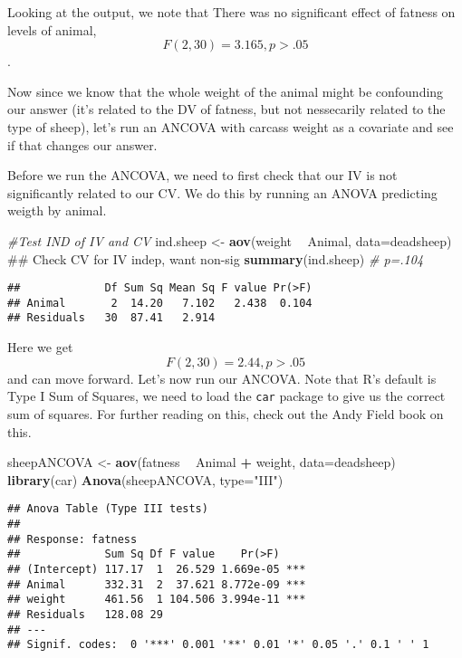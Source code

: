 \documentclass[]{book}
\newenvironment{Shaded}{\begin{snugshade}}{\end{snugshade}}
\newcommand{\KeywordTok}[1]{\textcolor[rgb]{0.13,0.29,0.53}{\textbf{#1}}}
\newcommand{\DataTypeTok}[1]{\textcolor[rgb]{0.13,0.29,0.53}{#1}}
\newcommand{\StringTok}[1]{\textcolor[rgb]{0.31,0.60,0.02}{#1}}
\newcommand{\CommentTok}[1]{\textcolor[rgb]{0.56,0.35,0.01}{\textit{#1}}}
\newcommand{\OperatorTok}[1]{\textcolor[rgb]{0.81,0.36,0.00}{\textbf{#1}}}
\newcommand{\NormalTok}[1]{#1}
\theoremstyle{definition}
\theoremstyle{definition}
\theoremstyle{definition}
\theoremstyle{remark}
\begin{document}
Looking at the output, we note that There was no significant effect of
fatness on levels of animal, \[F(2,30)=3.165, p > .05\].

Now since we know that the whole weight of the animal might be
confounding our answer (it's related to the DV of fatness, but not
nessecarily related to the type of sheep), let's run an ANCOVA with
carcass weight as a covariate and see if that changes our answer.

Before we run the ANCOVA, we need to first check that our IV is not
significantly related to our CV. We do this by running an ANOVA
predicting weigth by animal.

\begin{Shaded}
\begin{Highlighting}[]
\CommentTok{#Test IND of IV and CV}
\NormalTok{ind.sheep <-}\StringTok{ }\KeywordTok{aov}\NormalTok{(weight }\OperatorTok{~}\StringTok{ }\NormalTok{Animal, }\DataTypeTok{data=}\NormalTok{deadsheep) ## Check CV for IV indep, want non-sig}
\KeywordTok{summary}\NormalTok{(ind.sheep) }\CommentTok{# p=.104}
\end{Highlighting}
\end{Shaded}

\begin{verbatim}
##             Df Sum Sq Mean Sq F value Pr(>F)
## Animal       2  14.20   7.102   2.438  0.104
## Residuals   30  87.41   2.914
\end{verbatim}

Here we get\[ F(2,30) = 2.44, p> .05\] and can move forward. Let's now
run our ANCOVA. Note that R's default is Type I Sum of Squares, we need
to load the \texttt{car} package to give us the correct sum of squares.
For further reading on this, check out the Andy Field book on this.

\begin{Shaded}
\begin{Highlighting}[]
\NormalTok{sheepANCOVA <-}\StringTok{ }\KeywordTok{aov}\NormalTok{(fatness }\OperatorTok{~}\StringTok{ }\NormalTok{Animal }\OperatorTok{+}\StringTok{ }\NormalTok{weight, }\DataTypeTok{data=}\NormalTok{deadsheep)}
\KeywordTok{library}\NormalTok{(car)}
\KeywordTok{Anova}\NormalTok{(sheepANCOVA, }\DataTypeTok{type=}\StringTok{"III"}\NormalTok{)}
\end{Highlighting}
\end{Shaded}

\begin{verbatim}
## Anova Table (Type III tests)
## 
## Response: fatness
##             Sum Sq Df F value    Pr(>F)    
## (Intercept) 117.17  1  26.529 1.669e-05 ***
## Animal      332.31  2  37.621 8.772e-09 ***
## weight      461.56  1 104.506 3.994e-11 ***
## Residuals   128.08 29                      
## ---
## Signif. codes:  0 '***' 0.001 '**' 0.01 '*' 0.05 '.' 0.1 ' ' 1
\end{verbatim}
\end{document}
